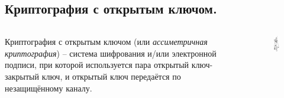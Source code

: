 \documentclass[presentation]{beamer}
\begin{document}


\subsection{Криптография с открытым ключом.}

\begin{frame}{}
  \begin{columns}
    \begin{column}{0.7\textwidth}
      \raisebox{-.30em}{\Large\HandRight}\hspace{.25em} Криптография с
      открытым ключом (или \textit{ассиметричная криптография}) -- система
      шифрования и/или электронной подписи, при которой используется пара
      открытый ключ-закрытый ключ, и открытый ключ передаётся по
      незащищённому каналу.
    \end{column}
    \begin{column}{0.3\textwidth}
      \begin{figure}[htb]
        \centering
        \includegraphics[height=0.8\textheight]{keys}
      \end{figure}
    \end{column}
  \end{columns}
\end{frame}
\end{document}
